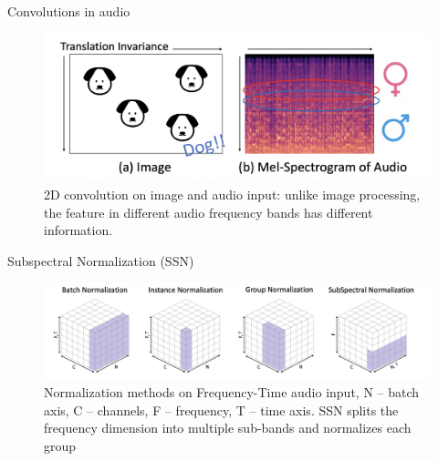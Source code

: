 \begin{frame}{Convolutions in audio}
    \begin{figure}
    	\centering
    	\includegraphics[width=0.99\linewidth]{figs/convolution_audio.png}
    	\caption{2D convolution on image and audio input: unlike image processing, the feature in different audio frequency bands has different information.}
    \end{figure}

\end{frame}
\begin{frame}{Subspectral Normalization (SSN)}
    \begin{figure}
    	\centering
    	\includegraphics[width=0.99\linewidth]{figs/subspectral_normalization.png}
    	\caption{Normalization methods on Frequency-Time audio input, N -- batch axis, C -- channels, F -- frequency, T -- time axis. SSN splits the frequency dimension into multiple sub-bands and normalizes each group}
    \end{figure}
    
\end{frame}
